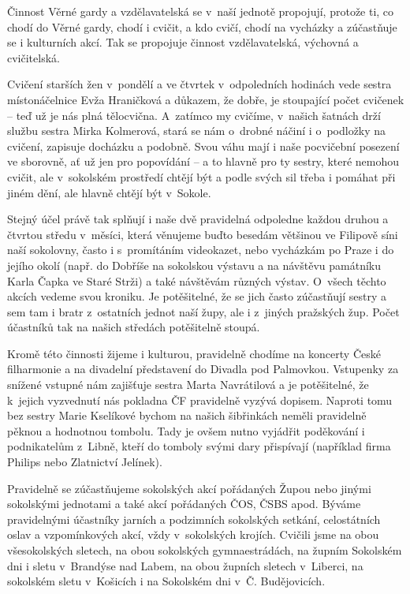 \documentclass[a5paper, 11pt, twoside]{article}
\begin{document}
Činnost Věrné gardy a vzdělavatelská se v~naší jednotě propojují,
protože ti, co chodí do Věrné gardy, chodí i cvičit, a kdo cvičí, chodí
na vycházky a zúčastňuje se i kulturních akcí. Tak se propojuje činnost
vzdělavatelská, výchovná a cvičitelská.

Cvičení starších žen v~pondělí a ve čtvrtek v~odpoledních hodinách vede
sestra místonáčelnice Evža Hraničková a důkazem, že dobře, je stoupající
počet cvičenek -- teď už je nás plná tělocvična. A~zatímco my cvičíme,
v~našich šatnách drží službu sestra Mirka Kolmerová, stará se nám o~drobné
náčiní i o~podložky na cvičení, zapisuje docházku a podobně. Svou váhu
mají i naše pocvičební posezení ve sborovně, ať už jen pro popovídání --
a to hlavně pro ty sestry, které nemohou cvičit, ale v~sokolském
prostředí chtějí být a podle svých sil třeba i pomáhat při jiném dění,
ale hlavně chtějí být v~Sokole.

Stejný účel právě tak splňují i naše dvě pravidelná odpoledne každou
druhou a čtvrtou středu v~měsíci, která věnujeme buďto besedám většinou
ve Filipově síni naší sokolovny, často i s~promítáním videokazet, nebo
vycházkám po Praze i do jejího okolí (např. do Dobříše na sokolskou
výstavu a na návštěvu památníku Karla Čapka ve Staré Strži) a také
návštěvám různých výstav. O~všech těchto akcích vedeme svou kroniku. Je
potěšitelné, že se jich často zúčastňují sestry a sem tam i bratr
z~ostatních jednot naší župy, ale i z~jiných pražských žup. Počet
účastníků tak na našich středách potěšitelně stoupá.

Kromě této činnosti žijeme i kulturou, pravidelně chodíme na koncerty
České filharmonie a na divadelní představení do Divadla pod Palmovkou.
Vstupenky za snížené vstupné nám zajišťuje sestra Marta Navrátilová a je
potěšitelné, že k~jejich vyzvednutí nás pokladna ČF pravidelně vyzývá
dopisem. Naproti tomu bez sestry Marie Kselíkové bychom na našich
šibřinkách neměli pravidelně pěknou a hodnotnou tombolu. Tady je ovšem
nutno vyjádřit poděkování i podnikatelům z~Libně, kteří do tomboly svými
dary přispívají (například firma Philips nebo Zlatnictví Jelínek).

Pravidelně se zúčastňujeme sokolských akcí pořádaných Župou nebo jinými
sokolskými jednotami a také akcí pořádaných ČOS, ČSBS apod. Býváme
pravidelnými účastníky jarních a podzimních sokolských setkání,
celostátních oslav a vzpomínkových akcí, vždy v~sokolských krojích.
Cvičili jsme na obou všesokolských sletech, na obou sokolských
gymnaestrádách, na župním Sokolském dni i sletu v~Brandýse nad Labem, na
obou župních sletech v~Liberci, na sokolském sletu v~Košicích i na
Sokolském dni v~Č. Budějovicích.
\end{document}
